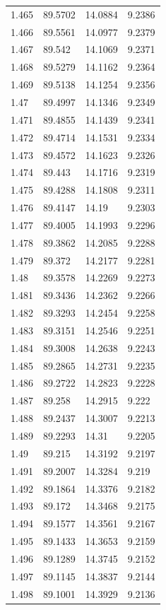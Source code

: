 \begin{tabular}{llll}
1.465 & 89.5702 & 14.0884 & 9.2386 \\
1.466 & 89.5561 & 14.0977 & 9.2379 \\
1.467 & 89.542 & 14.1069 & 9.2371 \\
1.468 & 89.5279 & 14.1162 & 9.2364 \\
1.469 & 89.5138 & 14.1254 & 9.2356 \\
1.47 & 89.4997 & 14.1346 & 9.2349 \\
1.471 & 89.4855 & 14.1439 & 9.2341 \\
1.472 & 89.4714 & 14.1531 & 9.2334 \\
1.473 & 89.4572 & 14.1623 & 9.2326 \\
1.474 & 89.443 & 14.1716 & 9.2319 \\
1.475 & 89.4288 & 14.1808 & 9.2311 \\
1.476 & 89.4147 & 14.19 & 9.2303 \\
1.477 & 89.4005 & 14.1993 & 9.2296 \\
1.478 & 89.3862 & 14.2085 & 9.2288 \\
1.479 & 89.372 & 14.2177 & 9.2281 \\
1.48 & 89.3578 & 14.2269 & 9.2273 \\
1.481 & 89.3436 & 14.2362 & 9.2266 \\
1.482 & 89.3293 & 14.2454 & 9.2258 \\
1.483 & 89.3151 & 14.2546 & 9.2251 \\
1.484 & 89.3008 & 14.2638 & 9.2243 \\
1.485 & 89.2865 & 14.2731 & 9.2235 \\
1.486 & 89.2722 & 14.2823 & 9.2228 \\
1.487 & 89.258 & 14.2915 & 9.222 \\
1.488 & 89.2437 & 14.3007 & 9.2213 \\
1.489 & 89.2293 & 14.31 & 9.2205 \\
1.49 & 89.215 & 14.3192 & 9.2197 \\
1.491 & 89.2007 & 14.3284 & 9.219 \\
1.492 & 89.1864 & 14.3376 & 9.2182 \\
1.493 & 89.172 & 14.3468 & 9.2175 \\
1.494 & 89.1577 & 14.3561 & 9.2167 \\
1.495 & 89.1433 & 14.3653 & 9.2159 \\
1.496 & 89.1289 & 14.3745 & 9.2152 \\
1.497 & 89.1145 & 14.3837 & 9.2144 \\
1.498 & 89.1001 & 14.3929 & 9.2136 \\

\end{tabular}
